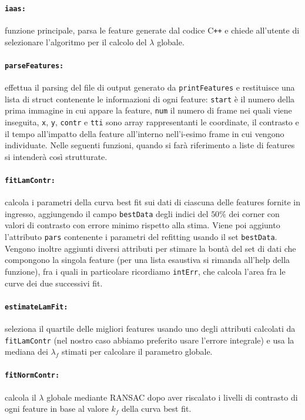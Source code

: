 \documentclass[12pt]{report}
\begin{document}
\paragraph*{\verb_iaas:_} funzione principale, parsa le feature generate dal codice C\verb|++| e chiede all'utente di selezionare l'algoritmo per il calcolo del $\lambda$ globale.

\paragraph*{\verb_parseFeatures:_} effettua il parsing del file di output generato da \verb|printFeatures| e restituisce una lista di struct contenente le informazioni di ogni feature: \verb|start| \`e il numero della prima immagine in cui appare la feature, \verb|num| il numero di frame nei quali viene inseguita, \verb|x|, \verb|y|, \verb|contr| e \verb|tti| sono array rappresentanti le coordinate, il contrasto e il tempo all'impatto della feature all'interno nell'i-esimo frame in cui vengono individuate. Nelle seguenti funzioni, quando si far\`a riferimento a liste di features si intender\`a cos\`i strutturate.

\paragraph*{\verb_fitLamContr:_} calcola i parametri della curva best fit sui dati di ciascuna delle features fornite in ingresso, aggiungendo il campo \verb|bestData| degli indici del $50\%$ dei corner con valori di contrasto con errore minimo rispetto alla stima. Viene poi aggiunto l'attributo \verb|pars| contenente i parametri del refitting usando il set \verb|bestData|. Vengono inoltre aggiunti diversi attributi per stimare la bont\`a del set di dati che compongono la singola feature (per una lista esaustiva si rimanda all'help della funzione), fra i quali in particolare ricordiamo \verb|intErr|, che calcola l'area fra le curve dei due successivi fit.

\paragraph*{\verb_estimateLamFit:_} seleziona il quartile delle migliori features usando uno degli attributi calcolati da \verb|fitLamContr| (nel nostro caso abbiamo preferito usare l'errore integrale) e usa la mediana dei $\lambda_f$ stimati per calcolare il parametro globale.

\paragraph*{\verb_fitNormContr:_} calcola il $\lambda$ globale mediante RANSAC dopo aver riscalato i livelli di contrasto di ogni feature in base al valore $k_f$ della curva best fit.
\end{document}
